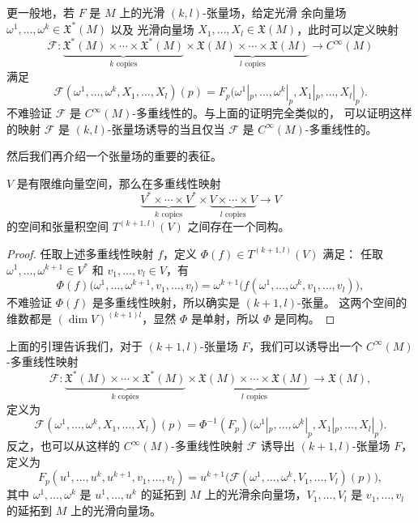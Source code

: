 更一般地，若 $F$ 是 $M$ 上的光滑 $(k,l)$-张量场，给定光滑
余向量场 $\omega^1,\dots,\omega^k\in \mathfrak{X}^*(M)$ 以及
光滑向量场 $X_1,\dots,X_l\in \mathfrak{X}(M)$，此时可以定义映射
\[
  \mathcal{F}:\underbrace{\mathfrak{X}^*(M)\times\cdots\times \mathfrak{X}^*(M)}
  _{\text{$k$ copies}}\times \underbrace{\mathfrak{X}(M)\times\cdots\times \mathfrak{X}(M)}
  _{\text{$l$ copies}}\to C^\infty(M)
\]
满足
\[
  \mathcal{F}(\omega^1,\dots,\omega^k,X_1,\dots,X_l)(p)
  =F_p\bigl(\omega^1|_p,\dots,\omega^k|_p,X_1|_p,\dots,X_l|_p\bigr)  .
\]
不难验证 $\mathcal{F}$ 是 $C^\infty(M)$-多重线性的。与上面的证明完全类似的，
可以证明这样的映射 $\mathcal{F}$ 是 $(k,l)$-张量场诱导的当且仅当
$\mathcal{F}$ 是 $C^\infty(M)$-多重线性的。

然后我们再介绍一个张量场的重要的表征。

\begin{lemma}
  $V$ 是有限维向量空间，那么在多重线性映射
  \[
    \underbrace{V^*\times\cdots\times V^*}_{\text{$k$ copies}}  \times
    \underbrace{V\times\cdots\times V}_{\text{$l$ copies}}  \to V
  \]
  的空间和张量积空间 $T^{(k+1,l)}(V)$ 之间存在一个同构。
\end{lemma}
\begin{proof}
  任取上述多重线性映射 $f$，定义 $\varPhi(f)\in T^{(k+1,l)}(V)$ 满足：
  任取 $\omega^1,\dots,\omega^{k+1}\in V^*$ 和 $v_1,\dots,v_l\in V$，有
  \[
    \varPhi(f)\bigl(\omega^1,\dots,\omega^{k+1},v_1,\dots,v_l\bigr) 
    =\omega^{k+1}\bigl(f(\omega^1,\dots,\omega^k,v_1,\dots,v_l)\bigr),
  \]
  不难验证 $\varPhi(f)$ 是多重线性映射，所以确实是 $(k+1,l)$-张量。
  这两个空间的维数都是 $(\dim V)^{(k+1)l}$，显然 $\varPhi$
  是单射，所以 $\varPhi$ 是同构。
\end{proof}

上面的引理告诉我们，对于 $(k+1,l)$-张量场 $F$，我们可以诱导出一个
$C^\infty(M)$-多重线性映射
\[
  \mathcal{F}:\underbrace{\mathfrak{X}^*(M)\times\cdots\times \mathfrak{X}^*(M)}
  _{\text{$k$ copies}}\times \underbrace{\mathfrak{X}(M)\times\cdots\times \mathfrak{X}(M)}
  _{\text{$l$ copies}}\to \mathfrak{X}(M),
\]
定义为
\[
  \mathcal{F}(\omega^1,\dots,\omega^k,X_1,\dots,X_l)(p)=
  \varPhi^{-1}(F_p)\bigl(\omega^1|_p,\dots,\omega^k|_p,X_1|_p,\dots,X_l|_p\bigr).
\]
反之，也可以从这样的 $C^\infty(M)$-多重线性映射 $\mathcal{F}$
诱导出 $(k+1,l)$-张量场 $F$，定义为
\[
  F_p(u^1,\dots,u^k,u^{k+1},v_1,\dots,v_l) =
  u^{k+1}\bigl(\mathcal{F}(\omega^1,\dots,\omega^k,V_1,\dots,V_l)(p)\bigr),
\]
其中 $\omega^1,\dots,\omega^k$ 是 $u^1,\dots,u^k$ 的延拓到 $M$
上的光滑余向量场，$V_1,\dots,V_l$ 是 $v_1,\dots,v_l$ 的延拓到 $M$
上的光滑向量场。

